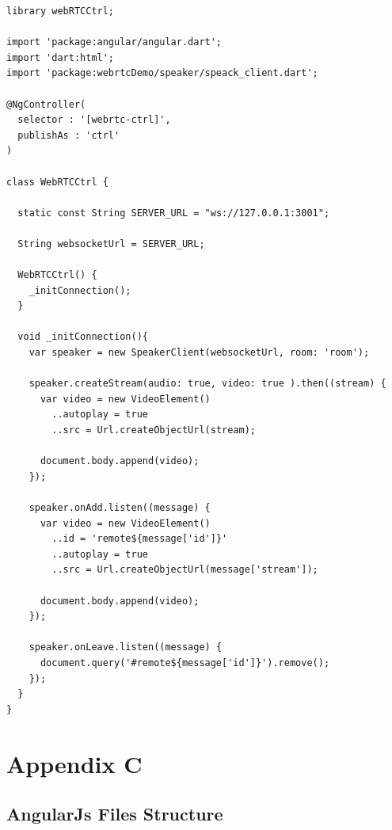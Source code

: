 \begin{appendices}
\begin{lstlisting}[caption={WebRTCCtrl in Dart application client},label={code:dart_webrtcctrl}]
library webRTCCtrl;

import 'package:angular/angular.dart';
import 'dart:html';
import 'package:webrtcDemo/speaker/speack_client.dart';

@NgController(
  selector : '[webrtc-ctrl]',
  publishAs : 'ctrl'
)

class WebRTCCtrl {

  static const String SERVER_URL = "ws://127.0.0.1:3001";

  String websocketUrl = SERVER_URL;

  WebRTCCtrl() {
    _initConnection();
  }

  void _initConnection(){
    var speaker = new SpeakerClient(websocketUrl, room: 'room');

    speaker.createStream(audio: true, video: true ).then((stream) {
      var video = new VideoElement()
        ..autoplay = true
        ..src = Url.createObjectUrl(stream);

      document.body.append(video);
    });

    speaker.onAdd.listen((message) {
      var video = new VideoElement()
        ..id = 'remote${message['id']}'
        ..autoplay = true
        ..src = Url.createObjectUrl(message['stream']);

      document.body.append(video);
    });

    speaker.onLeave.listen((message) {
      document.query('#remote${message['id']}').remove();
    });
  }
}
\end{lstlisting}

\chapter{Appendix C}

\section{AngularJs Files Structure} \label{code:angularjs_structure}


\end{appendices}
